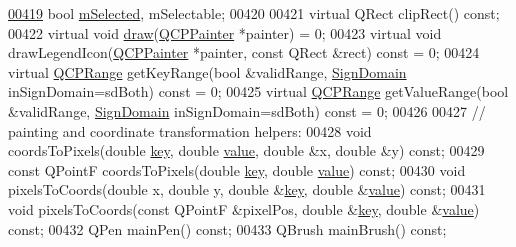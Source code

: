 \begin{DoxyCode}
\hypertarget{a00116_source_l00419}{}\hyperlink{a00024_a43f68a0603e9bcd016bdfa6d9d5c41c9}{00419}   \textcolor{keywordtype}{bool} \hyperlink{a00024_a43f68a0603e9bcd016bdfa6d9d5c41c9}{mSelected}, mSelectable;
00420   
00421   \textcolor{keyword}{virtual} QRect clipRect() \textcolor{keyword}{const};
00422   \textcolor{keyword}{virtual} \textcolor{keywordtype}{void} \hyperlink{a00116_a2e9b3d14dffa43c79835869d488936c9}{draw}(\hyperlink{a00047}{QCPPainter} *painter) = 0;
00423   \textcolor{keyword}{virtual} \textcolor{keywordtype}{void} drawLegendIcon(\hyperlink{a00047}{QCPPainter} *painter, \textcolor{keyword}{const} QRect &rect) \textcolor{keyword}{const} = 0;
00424   \textcolor{keyword}{virtual} \hyperlink{a00049}{QCPRange} getKeyRange(\textcolor{keywordtype}{bool} &validRange, \hyperlink{a00024_a661743478a1d3c09d28ec2711d7653d8}{SignDomain} inSignDomain=sdBoth) \textcolor{keyword}{const} = 
      0;
00425   \textcolor{keyword}{virtual} \hyperlink{a00049}{QCPRange} getValueRange(\textcolor{keywordtype}{bool} &validRange, \hyperlink{a00024_a661743478a1d3c09d28ec2711d7653d8}{SignDomain} inSignDomain=sdBoth) \textcolor{keyword}{const} 
      = 0;
00426   
00427   \textcolor{comment}{// painting and coordinate transformation helpers:}
00428   \textcolor{keywordtype}{void} coordsToPixels(\textcolor{keywordtype}{double} \hyperlink{a00116_a94bb892c30911cd62cba0707a5395be4}{key}, \textcolor{keywordtype}{double} \hyperlink{a00116_aee90379adb0307effb138f4871edbc5c}{value}, \textcolor{keywordtype}{double} &x, \textcolor{keywordtype}{double} &y) \textcolor{keyword}{const};
00429   \textcolor{keyword}{const} QPointF coordsToPixels(\textcolor{keywordtype}{double} \hyperlink{a00116_a94bb892c30911cd62cba0707a5395be4}{key}, \textcolor{keywordtype}{double} \hyperlink{a00116_aee90379adb0307effb138f4871edbc5c}{value}) \textcolor{keyword}{const};
00430   \textcolor{keywordtype}{void} pixelsToCoords(\textcolor{keywordtype}{double} x, \textcolor{keywordtype}{double} y, \textcolor{keywordtype}{double} &\hyperlink{a00116_a94bb892c30911cd62cba0707a5395be4}{key}, \textcolor{keywordtype}{double} &\hyperlink{a00116_aee90379adb0307effb138f4871edbc5c}{value}) \textcolor{keyword}{const};
00431   \textcolor{keywordtype}{void} pixelsToCoords(\textcolor{keyword}{const} QPointF &pixelPos, \textcolor{keywordtype}{double} &\hyperlink{a00116_a94bb892c30911cd62cba0707a5395be4}{key}, \textcolor{keywordtype}{double} &\hyperlink{a00116_aee90379adb0307effb138f4871edbc5c}{value}) \textcolor{keyword}{const};
00432   QPen mainPen() \textcolor{keyword}{const};
00433   QBrush mainBrush() \textcolor{keyword}{const};

\end{DoxyCode}
